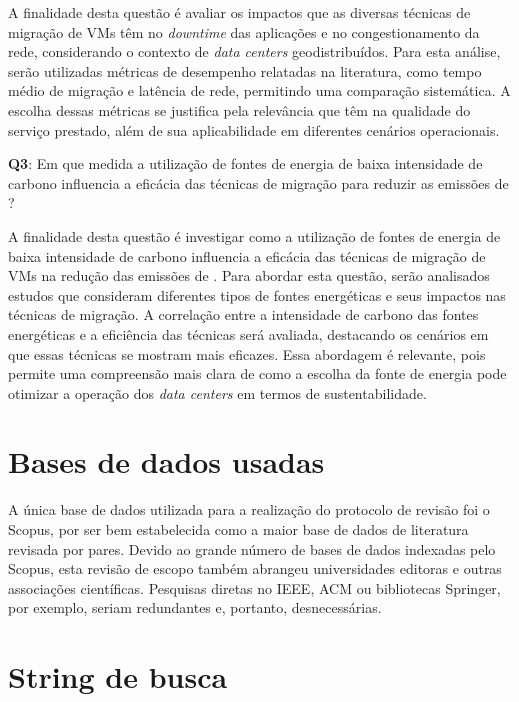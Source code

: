 \documentclass[
	12pt,				%
	oneside,			%
	a4paper,			%
	english,			%
	brazil				%
	]{abntex2ppgsi}
\begin{document}
\begin{apendicesenv}
A finalidade desta questão é avaliar os impactos que as diversas técnicas de migração de VMs têm no \textit{downtime} das aplicações e no congestionamento da rede, considerando o contexto de \textit{data centers} geodistribuídos. Para esta análise, serão utilizadas métricas de desempenho relatadas na literatura, como tempo médio de migração e latência de rede, permitindo uma comparação sistemática. A escolha dessas métricas se justifica pela relevância que têm na qualidade do serviço prestado, além de sua aplicabilidade em diferentes cenários operacionais.

\textbf{Q3}: Em que medida a utilização de fontes de energia de baixa intensidade de carbono influencia a eficácia das técnicas de migração para reduzir as emissões de ?

A finalidade desta questão é investigar como a utilização de fontes de energia de baixa intensidade de carbono influencia a eficácia das técnicas de migração de VMs na redução das emissões de . Para abordar esta questão, serão analisados estudos que consideram diferentes tipos de fontes energéticas e seus impactos nas técnicas de migração. A correlação entre a intensidade de carbono das fontes energéticas e a eficiência das técnicas será avaliada, destacando os cenários em que essas técnicas se mostram mais eficazes. Essa abordagem é relevante, pois permite uma compreensão mais clara de como a escolha da fonte de energia pode otimizar a operação dos \textit{data centers} em termos de sustentabilidade.

\section{Bases de dados usadas}\label{section:bases-de-dados-usadas}

A única base de dados utilizada para a realização do protocolo de revisão foi o Scopus, por ser bem estabelecida como a maior base de dados de literatura revisada por pares. Devido ao grande número de bases de dados indexadas pelo Scopus, esta revisão de escopo também abrangeu universidades editoras e outras associações científicas. Pesquisas diretas no IEEE, ACM ou bibliotecas Springer, por exemplo, seriam redundantes e, portanto, desnecessárias.

\section{String de busca}\label{section:string-de-busca}


\end{apendicesenv}
\end{document}
